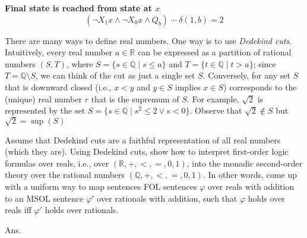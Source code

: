 \documentclass[11pt]{homework}
\begin{document}
\textbf{Final state is reached from state at \(x\)}
\[
(\neg X_1 x \land \neg X_0 x \land Q_b)\ \cdots\ \delta(1, b) = 2
\]

\question
There are many ways to define real numbers.
One way is to use \emph{Dedekind cuts}.
Intuitively, every real number \(a \in \mathbb{R}\) can be expressed as a partition of rational numbers \((S,T)\),
where \(S = \{s \in \mathbb{Q} \mid s \leq a\}\) and \(T = \{t \in \mathbb{Q} \mid t > a\}\);
since \(T = \mathbb{Q}\setminus S\),
we can think of the cut as just a single set \(S\).
Conversely, for any set \(S\) that is downward closed
(i.e., \(x < y\) and \(y \in S\) implies \(x \in S\))
corresponds to the (unique) real number \(r\) that is the supremum of \(S\).
For example, \(\sqrt{2}\) is represented by the set 
\(S = \{s \in \mathbb{Q} \mid s^2 \leq 2 \lor s < 0\}\).
Observe that \(\sqrt{2} \not\in S\) but \(\sqrt{2} = \sup(S)\)

Assume that Dedekind cuts are a faithful representation of all real numbers (which they are).
Using Dedekind cuts, show how to interpret first-order logic formulas over reals,
i.e., over \((\mathbb{R}, +, <, =, 0, 1)\),
into the monadic second-order theory over the rational numbers
\((\mathbb{Q}, +, <, =, 0, 1)\).
In other words, come up with a uniform way to map sentences FOL sentences \(\varphi\)
over reals with addition to an MSOL sentence \(\varphi'\) over rationals with addition,
such that \(\varphi\) holds over reals iff \(\varphi'\) holds over rationals.

Ans.
\end{document}
